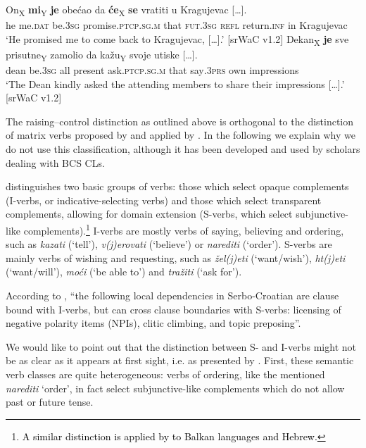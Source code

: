 \begin{exe}\ex\label{(2.29)}
\gll On\textsubscript{X} \textbf{mi}\textsubscript{Y} \textbf{je} obećao da \textbf{će}\textsubscript{X} \textbf{se} vratiti u {Kragujevac [\dots].} \\
 he me\textsc{.dat} be\textsc{.3sg} promise\textsc{.ptcp.sg.m} that \textsc{fut.3sg} \textsc{refl} return\textsc{.inf} in Kragujevac \\
\glt ‘He promised me to come back to Kragujevac, [\dots].’ 
\hfill [srWaC v1.2]
\ex\label{(2.30)}
\gll Dekan\textsubscript{X} \textbf{je} sve prisutne\textsubscript{Y} zamolio da kažu\textsubscript{Y} svoje {utiske [\dots].}  \\
 dean be\textsc{.3sg} all present ask\textsc{.ptcp.sg.m} that say\textsc{.3prs} own impressions  \\
\glt ‘The Dean kindly asked the attending members to share their impressions [\dots].’       
\hfill [srWaC v1.2]
\end{exe}

\noindent The raising--control distinction as outlined above is orthogonal to the distinction of matrix verbs proposed by \citet{Progovac93} and applied by \citet{Todorovic15}. In the following we explain why we do not use this classification, although it has been developed and used by scholars dealing with BCS CLs. 

\citet[116]{Progovac93} distinguishes two basic groups of verbs: those which select opaque complements (I-verbs, or indicative-selecting verbs) and those which select transparent complements, allowing for domain extension (S-verbs, which select subjunctive-like complements).\footnote{\textcolor{black}{A similar distinction is applied by \citet{Landau04} to Balkan languages and Hebrew.}} I-verbs are mostly verbs of saying, believing and ordering, such as \textit{kazati} (`tell'), \textit{v(j)erovati} (`believe') or \textit{narediti} (`order'). S-verbs are mainly verbs of wishing and requesting, such as \textit{žel(j)eti} (`want/wish'), \textit{ht(j)eti} (`want/will'), \textit{moći} (`be able to') and \textit{tražiti} (`ask for'). 

According to \citet[116]{Progovac93}, “the following local dependencies in Serbo-Croatian are clause bound with I-verbs, but can cross clause boundaries with S-verbs: licensing of negative polarity items (NPIs), clitic climbing, and topic preposing”. 

We would like to point out that the distinction between S- and I-verbs might not be as clear as it appears at first sight, i.e. as presented by \citet{Progovac93}. First, these semantic verb classes are quite heterogeneous: verbs of ordering, like the mentioned \textit{narediti} `order', in fact select subjunctive-like complements which do not allow past or future tense. 

